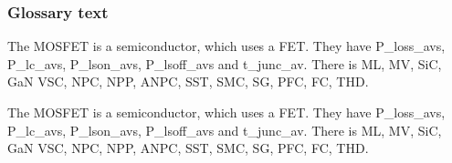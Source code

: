 \begin{frame}[allowframebreaks]
	\frametitle{Glossary text}%
    The \gls{MOSFET} is a semiconductor, which uses a \gls{FET}. They have \glspl{P_loss_av}, \glspl{P_lc_av}, \glspl{P_lson_av}, \glspl{P_lsoff_av}  and \gls{t_junc_av}. There is \gls{ML}, \gls{MV}, \gls{SiC}, \gls{GaN} \gls{VSC}, \gls{NPC}, \gls{NPP}, \gls{ANPC}, \gls{SST}, \gls{SMC}, \gls{SG}, \gls{PFC}, \gls{FC}, \gls{THD}.

    The \gls{MOSFET} is a semiconductor, which uses a \gls{FET}. They have \glspl{P_loss_av}, \glspl{P_lc_av}, \glspl{P_lson_av}, \glspl{P_lsoff_av}  and \gls{t_junc_av}. There is \gls{ML}, \gls{MV}, \gls{SiC}, \gls{GaN} \gls{VSC}, \gls{NPC}, \gls{NPP}, \gls{ANPC}, \gls{SST}, \gls{SMC}, \gls{SG}, \gls{PFC}, \gls{FC}, \gls{THD}.
\end{frame}